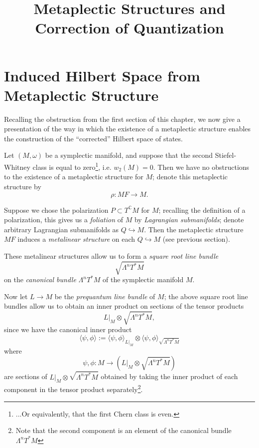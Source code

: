 \documentclass{tufte-handout}
\title{Metaplectic Structures and Correction of Quantization}
\date{}
\begin{document}
\section{Induced Hilbert Space from Metaplectic Structure}
Recalling the obstruction from the first section of this chapter, we now give a presentation of the way in which the existence of a metaplectic structure enables the construction of the ``corrected'' Hilbert space of states.

Let $(M,\omega)$ be a symplectic manifold, and suppose that the second Stiefel-Whitney class is equal to zero\footnote{...Or equivalently, that the first Chern class is even.}, i.e. $w_2(M) = 0$. Then we have no obstructions to the existence of a metaplectic structure for $M$; denote this metaplectic structure by
$$
\rho : MF \to M.
$$

Suppose we chose the polarization $P \subset T^{\mathbb{C}}M$ for $M$; recalling the definition of a polarization, this gives us a \emph{foliation} of $M$ by \emph{Lagrangian submanifolds}; denote arbitrary Lagrangian submanifolds as $Q \hookrightarrow M$. Then the metaplectic structure $MF$ induces a \emph{metalinear structure} on each $Q \hookrightarrow M$ (see previous section).

These metalinear structures allow us to form a \emph{square root line bundle}
$$
\sqrt{\Lambda^n T^* M}
$$
on the \emph{canonical bundle} $\Lambda^n T^* M$ of the symplectic manifold $M$.

Now let $L \to M$ be the \emph{prequantum line bundle} of $M$; the above square root line bundles allow us to obtain an inner product on sections of the tensor products
$$
L|_M \otimes \sqrt{\Lambda^n T^* M},
$$
since we have the canonical inner product
$$
\langle \psi, \phi \rangle := \langle \psi, \phi \rangle_{L|_M} \otimes \langle \psi, \phi \rangle_{\sqrt{\Lambda^n T^* M}}
$$
where
$$
\psi, \phi : M \to (L|_M \otimes \sqrt{\Lambda^n T^* M})
$$
are sections of $L|_M \otimes \sqrt{\Lambda^n T^* M}$ obtained by taking the inner product of each component in the tensor product separately\footnote{Note that the second component is an element of the canonical bundle $\Lambda^n T^* M$}.

\end{document}
